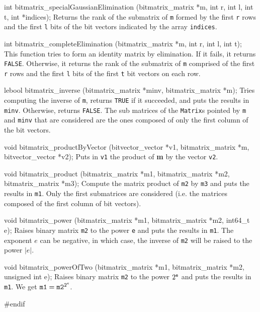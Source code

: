 int bitmatrix_specialGaussianElimination (bitmatrix_matrix *m,
                                          int r, int l, int t, int *indices);
\endcode
 \tab
Returns the rank of the submatrix of {\tt m} formed by the first {\tt r} rows
and the first {\tt l} bits of the bit vectors indicated by the array {\tt indices}.
 \endtab
 \code

int bitmatrix_completeElimination (bitmatrix_matrix *m, int r, int l, int t);
\endcode
 \tab
This function tries to form an identity matrix by elimination. If it fails, it returns {\tt FALSE}.
Otherwise, it returns the rank of the submatrix of {\tt m} comprised of the first
{\tt r} rows and the first {\tt l} bits of the first {\tt t} bit vectors on each row.
 \endtab
\code

lebool bitmatrix_inverse (bitmatrix_matrix *minv, bitmatrix_matrix *m);
\endcode
\tab
Tries computing the inverse of {\tt m}, returns {\tt TRUE} if it succeeded, and puts the results in {\tt minv}.
Otherwise, returns {\tt FALSE}.
The sub matrices of the {\tt Matrix}s pointed by {\tt m} and {\tt minv} that
are considered are the ones composed of only the first column of the bit vectors.
 \endtab
\code

void bitmatrix_productByVector (bitvector_vector *v1, bitmatrix_matrix *m,
                                bitvector_vector *v2);
\endcode
\tab
Puts in {\tt v1} the product of {\bf m} by the vector {\tt v2}.
 \endtab
\code

void bitmatrix_product (bitmatrix_matrix *m1, bitmatrix_matrix *m2,
                        bitmatrix_matrix *m3);
\endcode
\tab
Compute the matrix product of {\tt m2} by {\tt m3} and puts the results in {\tt m1}.
Only the first submatrices are considered (i.e. the matrices composed of the first column of bit vectors).
\endtab
\code

void bitmatrix_power (bitmatrix_matrix *m1, bitmatrix_matrix *m2, int64_t e);
\endcode
\tab
Raises binary matrix {\tt m2} to the power {\tt e} and puts the results in {\tt m1}.
The exponent $e$ can be negative, in which case, the inverse of {\tt m2}
will be raised to the power $|e|$.
\endtab
\code

void bitmatrix_powerOfTwo (bitmatrix_matrix *m1, bitmatrix_matrix *m2,
                           unsigned int e);
\endcode
\tab
Raises binary matrix {\tt m2} to the power $2^{\tt e}$ and puts the results in {\tt m1}.
We get ${\tt m1} = {\tt m2}^{2^{e}}$.
\endtab

\code\hide
#endif
\endhide\endcode
